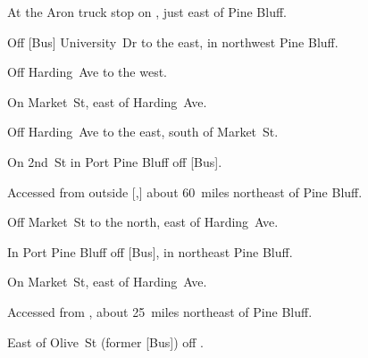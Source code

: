 
\begin{LocationList}

At the Aron truck stop on  , just east of Pine Bluff.

Off [Bus] University~Dr to the east, in northwest Pine Bluff.

Off Harding~Ave to the west.

On Market~St, east of Harding~Ave.

Off Harding~Ave to the east, south of Market~St.

\Location{\GarageHQ \Garage}
On 2nd~St in Port Pine Bluff off [Bus].

Accessed from   outside [,] about 60~miles northeast of Pine Bluff.

Off Market~St to the north, east of Harding~Ave.

In Port Pine Bluff off [Bus], in northeast Pine Bluff.

\Location{\RecruitmentAgency \Recruitment}
On Market~St, east of Harding~Ave.

Accessed from  , about 25~miles northeast of Pine Bluff.

East of  Olive~St (former [Bus]) off .

\end{LocationList}

